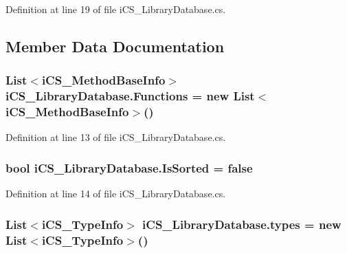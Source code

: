 Definition at line 19 of file i\+C\+S\+\_\+\+Library\+Database.\+cs.



\subsection{Member Data Documentation}
\hypertarget{classi_c_s___library_database_a35f2d99926a50bfe7b83954a89636b6d}{
\subsubsection[{Functions}]{\setlength{\rightskip}{0pt plus 5cm}List$<${\bf i\+C\+S\+\_\+\+Method\+Base\+Info}$>$ i\+C\+S\+\_\+\+Library\+Database.\+Functions = new List$<${\bf i\+C\+S\+\_\+\+Method\+Base\+Info}$>$()\hspace{0.3cm}{\ttfamily [static]}}}\label{classi_c_s___library_database_a35f2d99926a50bfe7b83954a89636b6d}


Definition at line 13 of file i\+C\+S\+\_\+\+Library\+Database.\+cs.

\hypertarget{classi_c_s___library_database_a992cd8b3df732b6aad4b8dda0de8db34}{
\subsubsection[{Is\+Sorted}]{\setlength{\rightskip}{0pt plus 5cm}bool i\+C\+S\+\_\+\+Library\+Database.\+Is\+Sorted = false\hspace{0.3cm}{\ttfamily [static]}}}\label{classi_c_s___library_database_a992cd8b3df732b6aad4b8dda0de8db34}


Definition at line 14 of file i\+C\+S\+\_\+\+Library\+Database.\+cs.

\hypertarget{classi_c_s___library_database_ae655472bf960359e100eb1c6d277bd1b}{
\subsubsection[{types}]{\setlength{\rightskip}{0pt plus 5cm}List$<${\bf i\+C\+S\+\_\+\+Type\+Info}$>$ i\+C\+S\+\_\+\+Library\+Database.\+types = new List$<${\bf i\+C\+S\+\_\+\+Type\+Info}$>$()\hspace{0.3cm}{\ttfamily [static]}}}\label{classi_c_s___library_database_ae655472bf960359e100eb1c6d277bd1b}


